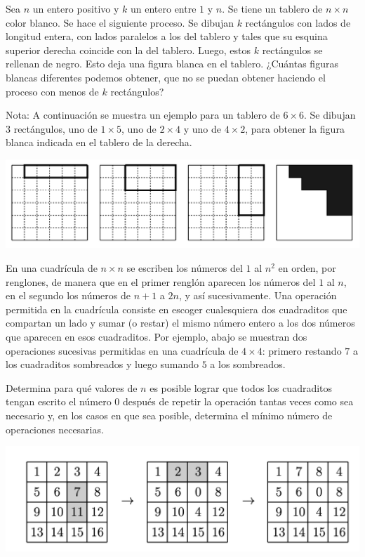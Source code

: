 \documentclass[11pt]{scrartcl}
\begin{document}
\begin{problem}
    [2015/2]
    Sea $n$ un entero positivo y $k$ un entero entre $1$ y $n$. Se tiene un tablero de $n \times n$ color blanco. Se hace el siguiente proceso. Se dibujan $k$ rectángulos con lados de longitud entera, con lados paralelos a los del tablero y tales que su esquina superior derecha coincide con la del tablero. Luego, estos $k$ rectángulos se rellenan de negro. Esto deja una figura blanca en el tablero.
¿Cuántas figuras blancas diferentes podemos obtener, que no se puedan obtener haciendo el proceso con menos de $k$ rectángulos?

Nota: A continuación se muestra un ejemplo para un tablero de $6 \times 6$. Se dibujan $3$ rectángulos, uno de $1 \times 5$, uno de $2 \times 4$ y uno de $4 \times 2$, para obtener la figura blanca indicada en el tablero de la derecha.
    \begin{center}
        \includegraphics[scale=0.3]{15OMM2.png}
    \end{center}
\end{problem}
\begin{problem}
    [2016/5]
    En una cuadrícula de $n \times n$ se escriben los números del $1$ al $n^2$ en orden, por renglones,
de manera que en el primer renglón aparecen los números del $1$ al $n$, en el segundo los
números de $n + 1$ a $2n$, y así sucesivamente. Una operación permitida en la cuadrícula
consiste en escoger cualesquiera dos cuadraditos que compartan un lado y sumar (o restar)
el mismo número entero a los dos números que aparecen en esos cuadraditos. Por ejemplo, abajo se muestran dos operaciones sucesivas permitidas en una cuadrícula de $4 \times 4$:
primero restando $7$ a los cuadraditos sombreados y luego sumando $5$ a los sombreados.

Determina para qué valores de $n$ es posible lograr que todos los cuadraditos tengan escrito
el número $0$ después de repetir la operación tantas veces como sea necesario y, en los casos
en que sea posible, determina el mínimo número de operaciones necesarias.
    \begin{center}
        \includegraphics[scale=0.3]{16OMM5.png}
    \end{center}
\end{problem}
\end{document}
